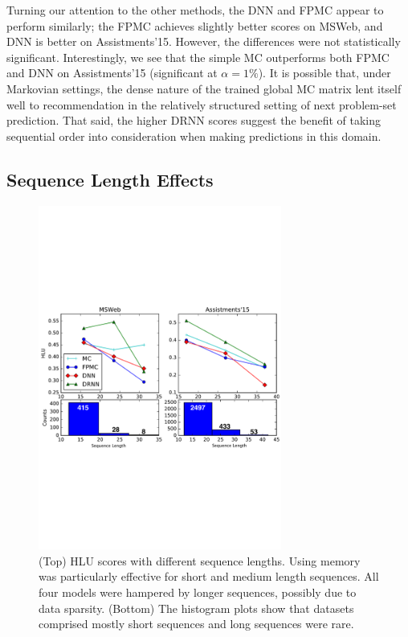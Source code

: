\documentclass{sig-alternate-05-2015}
\begin{document}
Turning our attention to the other methods, the DNN and FPMC appear to perform similarly; the FPMC achieves slightly better scores on MSWeb, and DNN is better on Assistments'15. However, the differences were not statistically significant. Interestingly, we see that the simple MC outperforms both FPMC and DNN on Assistments'15 (significant at $\alpha = 1\%$). It is possible that, under Markovian settings, the dense nature of the trained global MC matrix lent itself well to recommendation in the relatively structured setting of next problem-set prediction. That said, the higher DRNN scores suggest the benefit of taking sequential order into consideration when making predictions in this domain.

\subsection{Sequence Length Effects}
\begin{figure}
\centering
\includegraphics[width=8cm]{images/SeqLenPerfAnnotated}		
\caption{(Top) HLU scores with different sequence lengths. Using memory was particularly effective for short and medium length sequences. All four models were hampered by longer sequences, possibly due to data sparsity.  (Bottom) The histogram plots show that datasets comprised mostly short sequences and long sequences were rare.}
\label{fig:SeqLenResults}
\end{figure}
\end{document}
